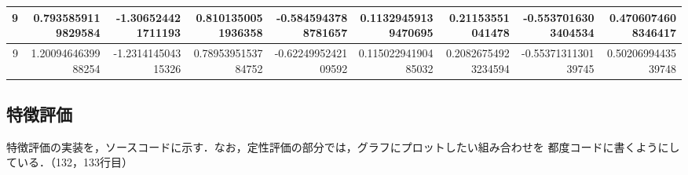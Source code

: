 \documentclass{jlreq}
\numberwithin{equation}{section}
\begin{document}
\begin{table}[H]
{\begin{tabular}{|r|r|r|r|r|r|r|r|r|}
      9 & 0.7935859119829584    & -1.306524421711193    & 0.8101350051936358   & -0.5845943788781657  & 0.11329459139470695   & 0.21153551041478      & -0.5537016303404534   & 0.4706074608346417    \\ \hline
      9 & 1.2009464639988254    & -1.231414504315326    & 0.7895395153784752   & -0.6224995242109592  & 0.11502294190485032   & 0.20826754923234594   & -0.5537131130139745   & 0.5020699443539748    \\ \hline
    \end{tabular}}
  \label{tab:csv}
\end{table}

\subsection{特徴評価}
特徴評価の実装を，ソースコードに示す．なお，定性評価の部分では，グラフにプロットしたい組み合わせを
都度コードに書くようにしている．（132，133行目）
\end{document}

